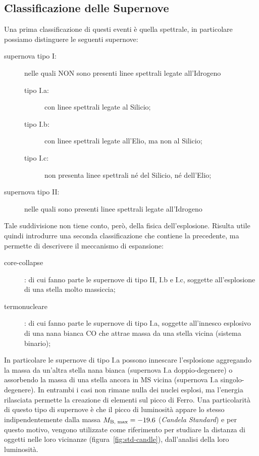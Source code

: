 \subsection{Classificazione delle Supernove} \label{sec:calss-supernove}

Una prima classificazione di questi eventi è quella spettrale, in particolare possiamo distinguere le seguenti supernove:
\begin{description}
    \item[supernova tipo I:] nelle quali NON sono presenti linee spettrali legate all'Idrogeno
    \begin{description}
        \item[tipo I.a:] con linee spettrali legate al Silicio;
        \item[tipo I.b:] con linee spettrali legate all'Elio, ma non al Silicio;
        \item[tipo I.c:] non presenta linee spettrali né del Silicio, né dell'Elio;
    \end{description}
    \item[supernova tipo II:] nelle quali sono presenti linee spettrali legate all'Idrogeno
\end{description}

Tale suddivisione non tiene conto, però, della fisica dell'esplosione. Risulta utile quindi introdurre una seconda classificazione che contiene la precedente, ma permette di descrivere il meccanismo di espansione:
\begin{description}
    \item[core-collapse]: di cui fanno parte le supernove di tipo II, I.b e I.c, soggette all'esplosione di una stella molto massiccia;
    \item[termonucleare]: di cui fanno parte le supernove di tipo I.a, soggette all'innesco esplosivo di una nana bianca CO che attrae massa da una stella vicina (sistema binario);
\end{description}

In particolare le supernove di tipo I.a possono innescare l'esplosione aggregando la massa da un'altra stella nana bianca (supernova I.a doppio-degenere) o assorbendo la massa di una stella ancora in MS vicina (supernova I.a singolo-degenere). In entrambi i casi non rimane nulla dei nuclei esplosi, ma l'energia rilasciata permette la creazione di elementi sul picco di Ferro. Una particolarità di questo tipo di supernove è che il picco di luminosità appare lo stesso indipendentemente dalla massa $M_\textup{B, max} = - 19.6$ (\emph{Candela Standard}) e per questo motivo, vengono utilizzate come riferimento per studiare la distanza di oggetti nelle loro vicinanze (figura~\ref{fig:std-candle}), dall'analisi della loro luminosità.

